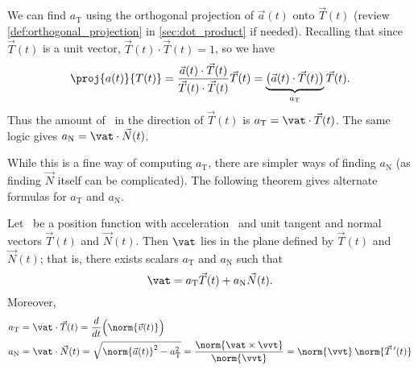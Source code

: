 We can find $a_{\mathrm{T}}$ using the orthogonal projection of $\vec a(t)$ onto $\vec T(t)$ (review \autoref{def:orthogonal_projection} in \autoref{sec:dot_product} if needed).
Recalling that since $\vec T(t)$ is a unit vector, $\vec T(t)\cdot\vec T(t)=1$, so we have 
\[\proj{a(t)}{T(t)} = \frac{\vec a(t)\cdot\vec T(t)}{\vec T(t)\cdot\vec T(t)}\vec T(t) = \underbrace{\big(\vec a(t)\cdot\vec T(t)\big)}_{a_{\mathrm{T}}}\vec T(t).\]
Thus the amount of \vat\ in the direction of $\vec T(t)$ is $a_{\mathrm{T}}=\vat\cdot\vec T(t)$. The same logic gives $a_{\mathrm{N}} = \vat\cdot\vec N(t)$.

While this is a fine way of computing $a_{\mathrm{T}}$, there are simpler ways of finding $a_{\mathrm{N}}$ (as finding $\vec N$ itself can be complicated). The following theorem gives alternate formulas for $a_{\mathrm{T}}$ and $a_{\mathrm{N}}$.


{
\begin{theorem}\label{thm:acc_plane}
Let \vrt\ be a position function with acceleration \vat\ and unit tangent and normal vectors $\vec T(t)$ and $\vec N(t)$. Then $\vat$ lies in the plane defined by $\vec T(t)$ and $\vec N(t)$; that is, there exists scalars $a_{\mathrm{T}}$ and $a_{\mathrm{N}}$ such that
\[\vat = a_{\mathrm{T}}\vec T(t) + a_{\mathrm{N}}\vec N(t).\]
Moreover,
\begin{align*}
a_\mathrm{T} &= \vat\cdot\vec T(t) = \frac{d}{dt}\Big(\norm{\vec v(t)}\Big) \\
a_\mathrm{N} &= \vat\cdot \vec N(t) = \sqrt{\norm{\vec a(t)}^2-a_\mathrm{T}^2} = \frac{\norm{\vat\times\vvt}}{\norm{\vvt}} = \norm{\vvt}\,\norm{\vec T\,'(t)}
\end{align*}%
%
%
\end{theorem}
}

